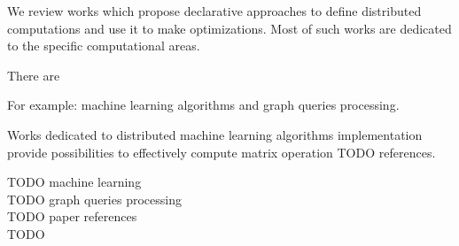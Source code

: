 We review works which propose declarative approaches to define distributed computations and use it to make optimizations.
Most of such works are dedicated to the specific computational areas.

There are

For example: machine learning algorithms and graph queries processing.



Works dedicated to distributed machine learning algorithms implementation provide possibilities to effectively compute matrix operation TODO references.

TODO machine learning \\
TODO graph queries processing \\
TODO paper references \\
TODO
